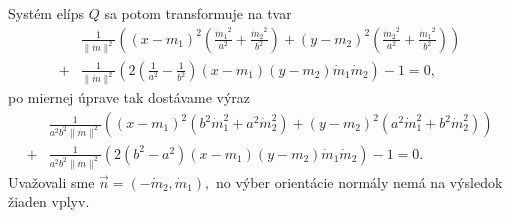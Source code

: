 %
Systém elíps $Q$ sa potom transformuje na tvar
\begin{align} 
\label{eq:elipsa_v_novej_baze}
&\frac{1}{\|{\dot{m}}\|^2} \left( (x - m_1)^2 \left( \frac{{\dot{m}_1}^2}{a^2} + \frac{{\dot{m}_2}^2}{b^2} \right) + (y - m_2)^2 \left( \frac{{\dot{m}_2}^2}{a^2} + \frac{{\dot{m}_1}^2}{b^2} \right) \right) \\
+ &\frac{1}{\|{\dot{m}}\|^2} \left( 2\left( \frac{1}{a^2} - \frac{1}{b^2} \right)(x - m_1)(y - m_2)\dot{m}_1\dot{m}_2 \right) - 1 = 0,
\end{align}
po miernej úprave tak dostávame výraz
\begin{align*} 
&\frac{1}{a^2b^2\|\dot{m}\|^2} \left( (x - m_1)^2 \left( b^2 \dot{m}_1^2 + a^2 \dot{m}_2^2 \right) + (y - m_2)^2 \left( a^2 \dot{m}_1^2 + b^2 \dot{m}_2^2 \right) \right) \\
+ &\frac{1}{a^2b^2\|\dot{m}\|^2} \left( 2(b^2 - a^2)(x - m_1)(y - m_2)\dot{m}_1\dot{m}_2 \right) - 1 = 0.
\end{align*}
Uvažovali sme $\vec{n}=(-\dot{m}_2, \dot{m}_1), $ no výber orientácie normály nemá na výsledok žiaden vplyv.

